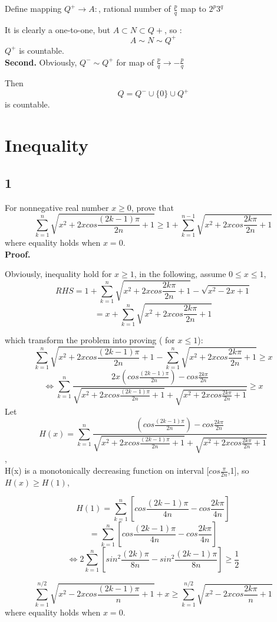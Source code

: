 \documentclass[11pt,a4paper]{article}
\begin{document}
Define mapping  $Q^+ \longrightarrow A : $, rational number of $\frac{p}{q}$ map to $ 2^p3^q$ 

It is clearly a one-to-one, but $ A \subset N \subset Q+$, so :
$$ A \sim N \sim Q^+$$
$Q^+$ is countable.
\\\textbf{Second.} 
Obviously, $Q^- \sim Q^+ $ for map of $\frac{p}{q} \rightarrow -\frac{p}{q}$

Then 
$$ Q = Q^- \cup \{0\} \cup Q^+$$ is countable.

\section{Inequality}
\subsection{1}
For nonnegative real number $x \ge 0$, prove that
$$ \sum_{k=1}^{n}\sqrt{x^2+2xcos\frac{(2k-1)\pi}{2n} + 1} \ge 1+ \sum_{k=1}^{n-1}\sqrt{x^2+2xcos\frac{2k\pi}{2n} + 1}$$
where equality holds when $x=0$.
\\\textbf{Proof.}

Obviously, inequality hold for $x \ge 1$, in the following, assume $0 \le x \le 1$,
$$RHS=1+ \sum_{k=1}^{n}\sqrt{x^2+2xcos\frac{2k\pi}{2n} + 1} - \sqrt{x^2-2x+1}$$
$$=x+\sum_{k=1}^{n}\sqrt{x^2+2xcos\frac{2k\pi}{2n} + 1}$$

which transform the problem into proving ( for $ x \le 1$):
$$\sum_{k=1}^{n}\sqrt{x^2+2xcos\frac{(2k-1)\pi}{2n} + 1} - \sum_{k=1}^{n}\sqrt{x^2+2xcos\frac{2k\pi}{2n} + 1} \ge x$$
$$\Longleftrightarrow \sum_{k=1}^{n}\frac{2x(cos\frac{(2k-1)\pi}{2n})-cos\frac{2k\pi}{2n}}{\sqrt{x^2+2xcos\frac{(2k-1)\pi}{2n} + 1} + \sqrt{x^2+2xcos\frac{2k\pi}{2n} + 1}} \ge x$$
Let $$H(x) = \sum_{k=1}^{n}\frac{(cos\frac{(2k-1)\pi}{2n})-cos\frac{2k\pi}{2n}}{\sqrt{x^2+2xcos\frac{(2k-1)\pi}{2n} + 1} + \sqrt{x^2+2xcos\frac{2k\pi}{2n} + 1}}$$,
\\H(x) is a monotonically decreasing function on interval [$cos\frac{\pi}{2n}$,1], so $H(x) \ge H(1)$,

$$H(1) = \sum_{k=1}^{n}[cos\frac{(2k-1)\pi}{4n} - cos\frac{2k\pi}{4n}] $$
$$=\sum_{k=1}^{n}[cos\frac{(2k-1)\pi}{4n} - cos\frac{2k\pi}{4n}]$$
$$\Longleftrightarrow 2\sum_{k=1}^{n}[sin^2\frac{(2k)\pi}{8n} - sin^2\frac{(2k-1)\pi}{8n}] \ge \frac{1}{2}$$

$$ \sum_{k=1}^{n/2}\sqrt{x^2-2xcos\frac{(2k-1)\pi}{n} + 1} +x \ge \sum_{k=1}^{n/2}\sqrt{x^2-2xcos\frac{2k\pi}{n} + 1}$$
where equality holds when $x=0$.
\end{document}
